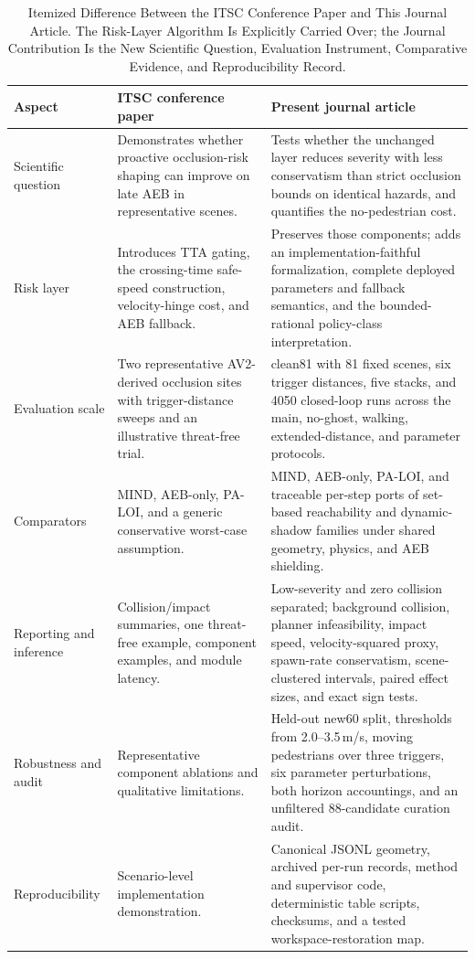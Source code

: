 \begin{table}[H]
\caption{Itemized Difference Between the ITSC Conference Paper and This Journal Article. The Risk-Layer Algorithm Is Explicitly Carried Over; the Journal Contribution Is the New Scientific Question, Evaluation Instrument, Comparative Evidence, and Reproducibility Record.}
\label{tab:conference-delta}
\centering
\scriptsize
\setlength{\tabcolsep}{4pt}
\renewcommand{\arraystretch}{1.12}
\begin{tabular}{>{\raggedright\arraybackslash}p{}>{\raggedright\arraybackslash}p{}>{\raggedright\arraybackslash}p{}}
\toprule
Aspect & ITSC conference paper & Present journal article \\
\midrule
Scientific question & Demonstrates whether proactive occlusion-risk shaping can improve on late AEB in representative scenes. & Tests whether the unchanged layer reduces severity with less conservatism than strict occlusion bounds on identical hazards, and quantifies the no-pedestrian cost. \\
Risk layer & Introduces TTA gating, the crossing-time safe-speed construction, velocity-hinge cost, and AEB fallback. & Preserves those components; adds an implementation-faithful formalization, complete deployed parameters and fallback semantics, and the bounded-rational policy-class interpretation. \\
Evaluation scale & Two representative AV2-derived occlusion sites with trigger-distance sweeps and an illustrative threat-free trial. & clean81 with 81 fixed scenes, six trigger distances, five stacks, and 4050 closed-loop runs across the main, no-ghost, walking, extended-distance, and parameter protocols. \\
Comparators & MIND, AEB-only, PA-LOI, and a generic conservative worst-case assumption. & MIND, AEB-only, PA-LOI, and traceable per-step ports of set-based reachability and dynamic-shadow families under shared geometry, physics, and AEB shielding. \\
Reporting and inference & Collision/impact summaries, one threat-free example, component examples, and module latency. & Low-severity and zero collision separated; background collision, planner infeasibility, impact speed, velocity-squared proxy, spawn-rate conservatism, scene-clustered intervals, paired effect sizes, and exact sign tests. \\
Robustness and audit & Representative component ablations and qualitative limitations. & Held-out new60 split, thresholds from 2.0--3.5\,m/s, moving pedestrians over three triggers, six parameter perturbations, both horizon accountings, and an unfiltered 88-candidate curation audit. \\
Reproducibility & Scenario-level implementation demonstration. & Canonical JSONL geometry, archived per-run records, method and supervisor code, deterministic table scripts, checksums, and a tested workspace-restoration map. \\
\bottomrule
\end{tabular}
\end{table}
